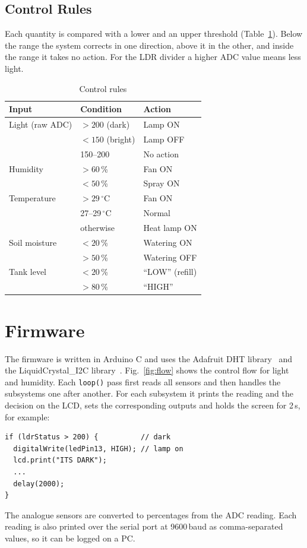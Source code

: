 \documentclass[10pt,twocolumn,a4paper]{article}
\begin{document}
\subsection{Control Rules}
Each quantity is compared with a lower and an upper threshold (Table~\ref{tab:rules}). Below the range the system corrects in one direction, above it in the other, and inside the range it takes no action. For the LDR divider a higher ADC value means less light.

\begin{table}[h]
\centering\small
\caption{Control rules}\label{tab:rules}
\begin{tabular}{@{}lll@{}}
\toprule
Input & Condition & Action \\ \midrule
Light (raw ADC) & $>200$ (dark) & Lamp ON \\
 & $<150$ (bright) & Lamp OFF \\
 & 150--200 & No action \\
Humidity & $>60$\,\% & Fan ON \\
 & $<50$\,\% & Spray ON \\
Temperature & $>29\,^\circ$C & Fan ON \\
 & 27--29\,$^\circ$C & Normal \\
 & otherwise & Heat lamp ON \\
Soil moisture & $<20$\,\% & Watering ON \\
 & $>50$\,\% & Watering OFF \\
Tank level & $<20$\,\% & ``LOW'' (refill) \\
 & $>80$\,\% & ``HIGH'' \\
\bottomrule
\end{tabular}
\end{table}

\section{Firmware}\label{sec:sw}
The firmware is written in Arduino C and uses the Adafruit DHT library~\cite{adafruitdht} and the LiquidCrystal\_I2C library~\cite{lcdi2c}. Fig.~\ref{fig:flow} shows the control flow for light and humidity. Each \texttt{loop()} pass first reads all sensors and then handles the subsystems one after another. For each subsystem it prints the reading and the decision on the LCD, sets the corresponding outputs and holds the screen for 2\,s, for example:
\begin{lstlisting}
if (ldrStatus > 200) {          // dark
  digitalWrite(ledPin13, HIGH); // lamp on
  lcd.print("ITS DARK");
  ...
  delay(2000);
}
\end{lstlisting}
The analogue sensors are converted to percentages from the ADC reading. Each reading is also printed over the serial port at 9600\,baud as comma-separated values, so it can be logged on a PC.
\end{document}
